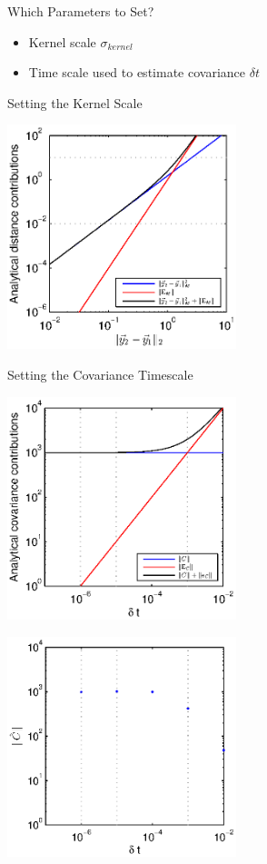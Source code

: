 \documentclass[12pt]{beamer}
\begin{document}
\begin{frame}{Which Parameters to Set?}

\begin{itemize}
\item Kernel scale $\sigma_{kernel}$
\item Time scale used to estimate covariance $\delta t$
\end{itemize}
\end{frame}

\begin{frame}{Setting the Kernel Scale}

\includegraphics[width=0.5\textwidth]{dist_dy_analytical_nonlinear}


\end{frame}

\begin{frame}{Setting the Covariance Timescale}

\includegraphics[width=0.5\textwidth]{C_dt_analytical_linear}

\includegraphics[width=0.5\textwidth]{C_dt_linear}

\end{frame}
\end{document}
